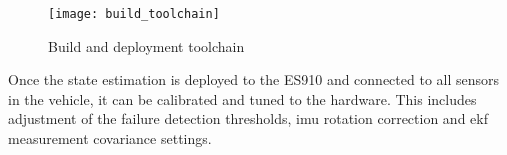 \begin{figure}
	\centering
	\texttt{[image: build\_toolchain]}%
	\caption{Build and deployment toolchain}
	\label{fig:build-toolchain}
\end{figure}

Once the state estimation is deployed to the ES910 and connected to all sensors in the vehicle, it can be calibrated and tuned to the hardware. This includes adjustment of the failure detection thresholds, \gls{imu} rotation correction and \gls{ekf} measurement covariance settings.
